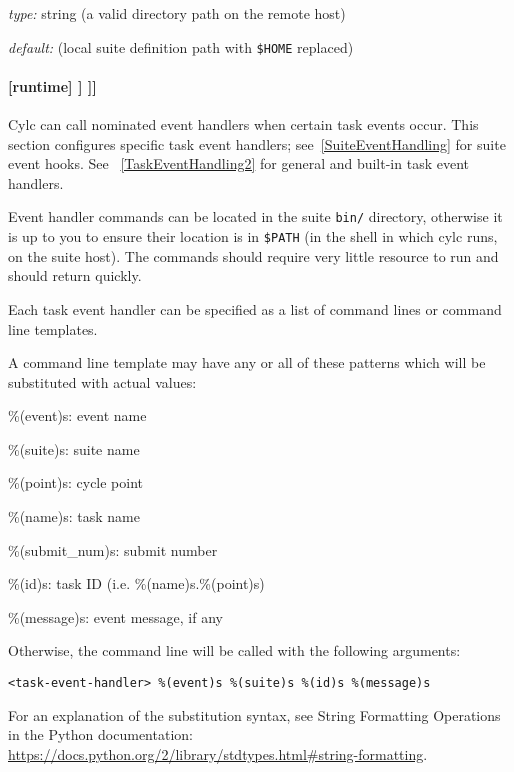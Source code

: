 \begin{myitemize}
\item {\em type:} string (a valid directory path on the remote host)
\item {\em default:} (local suite definition path with \lstinline=$HOME=
    replaced)
\end{myitemize}


\paragraph[{[[[}events{]]]}]{[runtime] \textrightarrow [[\_\_NAME\_\_]] \textrightarrow [[[events]]]}
\label{TaskEventHandling}

Cylc can call nominated event handlers when certain task events occur. This
section configures specific task event handlers; see~\ref{SuiteEventHandling} for
suite event hooks. See ~\ref{TaskEventHandling2} for general and built-in
task event handlers.

Event handler commands can be located in the suite \lstinline=bin/= directory,
otherwise it is up to you to ensure their location is in \lstinline=$PATH= (in
the shell in which cylc runs, on the suite host). The commands should require
very little resource to run and should return quickly.

Each task event handler can be specified as a list of command lines or command
line templates.

A command line template may have any or all of these patterns which will be
substituted with actual values:
\begin{myitemize}
    \item \%(event)s: event name
    \item \%(suite)s: suite name
    \item \%(point)s: cycle point
    \item \%(name)s: task name
    \item \%(submit\_num)s: submit number
    \item \%(id)s: task ID (i.e. \%(name)s.\%(point)s)
    \item \%(message)s: event message, if any
\end{myitemize}

Otherwise, the command line will be called with the following arguments:
\begin{lstlisting}
<task-event-handler> %(event)s %(suite)s %(id)s %(message)s
\end{lstlisting}

For an explanation of the substitution syntax, see String Formatting Operations
in the Python documentation:
\url{https://docs.python.org/2/library/stdtypes.html#string-formatting}.

